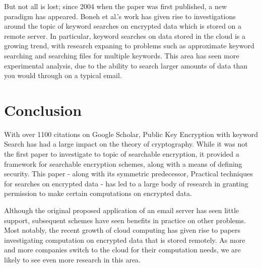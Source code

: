 \documentclass[a4paper,11pt]{article}
\begin{document}
    But not all is lost; since 2004 when the paper was first published, a new paradigm has appeared. Boneh et al.'s work has given rise to investigations around the topic of keyword searches on encrypted data which is stored on a remote server\cite{chang:remote}. In particular, keyword searches on data stored in the cloud is a growing trend, with research expaning to problems such as approximate keyword searching\cite{5462196} and searching files for multiple keywords\cite{6674958}. This area has seen more experimental analysis, due to the ability to search larger amounts of data than you would through on a typical email.

    \section{Conclusion}

    With over 1100 citations on Google Scholar, Public Key Encryption with keyword Search has had a large impact on the theory of cryptography. While it was not the first paper to investigate to topic of searchable encryption, it provided a framework for searchable encryption schemes, along with a means of defining security. This paper - along with its symmetric predecessor, Practical techniques for searches on encrypted data - has led to a large body of research in granting permission to make certain computations on encrypted data.

    Although the original proposed application of an email server has seen little support, subsequent schemes have seen benefits in practice on other problems. Most notably, the recent growth of cloud computing has given rise to papers investigating computation on encrypted data that is stored remotely. As more and more companies switch to the cloud for their computation needs, we are likely to see even more research in this area.

    \printbibliography
\end{document}
